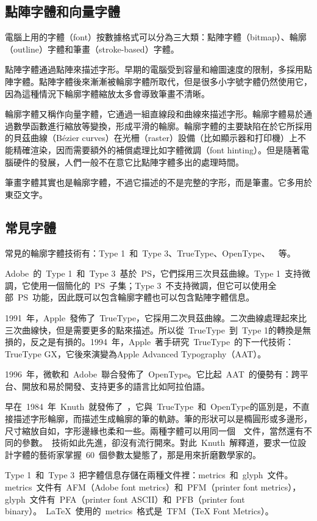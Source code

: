 \subsection{點陣字體和向量字體}
電腦上用的字體（font）按數據格式可以分為三大類：點陣字體（bitmap）、輪廓（outline）字體和筆畫（stroke-based）字體。

點陣字體通過點陣來描述字形。早期的電腦受到容量和繪圖速度的限制，多採用點陣字體。點陣字體後來漸漸被輪廓字體所取代，但是很多小字號字體仍然使用它，因為這種情況下輪廓字體縮放太多會導致筆畫不清晰。

輪廓字體又稱作向量字體，它通過一組直線段和曲線來描述字形。輪廓字體易於通過數學函數進行縮放等變換，形成平滑的輪廓。輪廓字體的主要缺陷在於它所採用的貝茲曲線（Bézier curves）在光柵（raster）設備（比如顯示器和打印機）上不能精確渲染，因而需要額外的補償處理比如字體微調（font hinting）。但是隨著電腦硬件的發展，人們一般不在意它比點陣字體多出的處理時間。

筆畫字體其實也是輪廓字體，不過它描述的不是完整的字形，而是筆畫。它多用於東亞文字。

\subsection{常見字體}

常見的輪廓字體技術有：Type 1~和~Type 3、TrueType、OpenType、~\MF~等。

Adobe~的~Type 1~和~Type 3~基於~PS，它們採用三次貝茲曲線。Type 1~支持微調，它使用一個簡化的~PS~子集；Type 3~不支持微調，但它可以使用全部~PS~功能，因此既可以包含輪廓字體也可以包含點陣字體信息。
    
1991~年，Apple~發佈了~TrueType，它採用二次貝茲曲線。二次曲線處理起來比三次曲線快，但是需要更多的點來描述。所以從~TrueType~到~Type 1的轉換是無損的，反之是有損的。1994~年，Apple~著手研究~TrueType~的下一代技術：TrueType GX，它後來演變為Apple Advanced Typography（AAT）。

1996~年，微軟和~Adobe~聯合發佈了~OpenType。它比起~AAT~的優勢有：跨平台、開放和易於開發、支持更多的語言比如阿拉伯語。

早在~1984~年~Knuth~就發佈了~\MF，它與~TrueType~和~OpenType的區別是，不直接描述字形輪廓，而描述生成輪廓的筆的軌跡。筆的形狀可以是橢圓形或多邊形，尺寸縮放自如，字形邊緣也柔和一些。兩種字體可以用同一個~\MF~文件，當然還有不同的參數。\MF~技術如此先進，卻沒有流行開來。對此~Knuth~解釋道，要求一位設計字體的藝術家掌握~60~個參數太變態了，那是用來折磨數學家的。

Type 1~和~Type 3~把字體信息存儲在兩種文件裡：metrics~和~glyph~文件。metrics~文件有~AFM（Adobe font metrics）和~PFM（printer font metrics），glyph~文件有~PFA（printer font ASCII）和~PFB（printer font binary）。~\LaTeX~使用的~metrics~格式是~TFM（TeX Font Metrics）。

